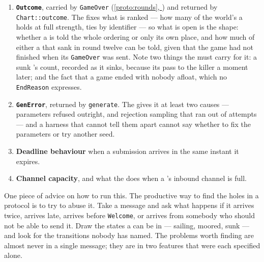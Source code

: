 \documentclass{article}
\newcommand{\fullref}[1]{\hyperref[#1]{\cref*{#1}, \nameref*{#1}}}
\begin{document}
\begin{enumerate}
      a \clue, a refusal, and ``not yet, come back in $n$ rounds''. A \clue{} it returns is always
      of the same variant as the one it was given.
    \item \textbf{\texttt{Outcome}}, carried by \texttt{GameOver} (\fullref{proto:rounds}) and
      returned by \texttt{Chart::outcome}. The \MD{} fixes what is ranked --- how many of the
      world's \clues{} a \ship{} holds at full strength, ties by identifier --- so what is open is
      the shape: whether a \ship{} is told the whole ordering or only its own place, and how much
      of either a \ship{} that sank in round twelve can be told, given that the game had not
      finished when its \texttt{GameOver} was sent. Note two things the \chart{} must carry for
      it: a sunk \ship's count, recorded as it sinks, because its \clues{} pass to the killer a
      moment later; and the fact that a game ended with nobody afloat, which no \texttt{EndReason}
      expresses.
    \item \textbf{\texttt{GenError}}, returned by \texttt{generate}. The \MD{} gives it at least
      two causes --- parameters refused outright, and rejection sampling that ran out of attempts
      --- and a harness that cannot tell them apart cannot say whether to fix the parameters or
      try another seed.
    \item \textbf{Deadline behaviour} when a submission arrives in the same instant it expires.
    \item \textbf{Channel capacity}, and what the \admiralty{} does when a \ship's inbound channel
      is full.
\end{enumerate}

One piece of advice on how to run this. The productive way to find the holes in a protocol is to
try to abuse it. Take a message and ask what happens if it arrives twice, arrives late, arrives
before \texttt{Welcome}, or arrives from somebody who should not be able to send it. Draw the
states a \ship{} can be in --- sailing, moored, sunk --- and look for the transitions nobody has
named. The problems worth finding are almost never in a single message; they are in two features
that were each specified alone.
\end{document}
